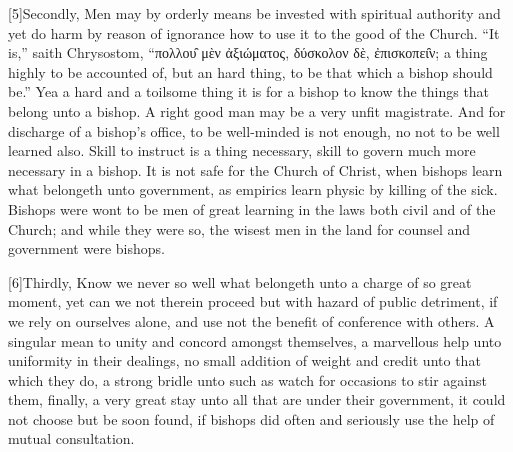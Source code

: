 [5]Secondly, Men may by orderly means be invested with spiritual authority and yet do harm by reason of ignorance how to use it to the good of the Church. “It is,” saith Chrysostom, “πολλου̑ μὲν ἀξιώματος, δύσκολον δὲ, ἐπισκοπει̑ν; a thing highly to be accounted of, but an hard thing, to be that which a bishop should be.” Yea a hard and a toilsome thing it is for a bishop to know the things that belong unto a bishop. A right good man may be a very unfit magistrate. And for discharge of a bishop’s office, to be well-minded is not enough, no not to be well learned also. Skill to instruct is a thing necessary, skill to govern much more necessary in a bishop. It is not safe for the Church of Christ, when bishops learn what belongeth unto government, as empirics learn physic by killing of the sick. Bishops were wont to be men of great learning in the laws both civil and of the Church; and while they were so, the wisest men in the land for counsel and government were bishops.

[6]Thirdly, Know we never so well what belongeth unto a charge of so great moment, yet can we not therein proceed but with hazard of public detriment, if we rely on ourselves alone, and use not the benefit of conference with others. A singular mean to unity and concord amongst themselves, a marvellous help unto uniformity in their dealings, no small addition of weight and credit unto that which they do, a strong bridle unto such as watch for occasions to stir against them, finally, a very great stay unto all that are under their government, it could not choose but be soon found, if bishops did often and seriously use the help of mutual consultation.

